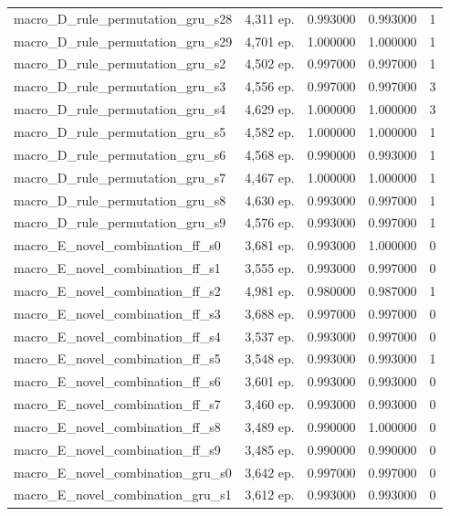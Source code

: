 \begin{tabular}{llrrr}
macro\_D\_rule\_permutation\_gru\_s28 & 4,311 ep. & 0.993000 & 0.993000 & 1 \\
macro\_D\_rule\_permutation\_gru\_s29 & 4,701 ep. & 1.000000 & 1.000000 & 1 \\
macro\_D\_rule\_permutation\_gru\_s2 & 4,502 ep. & 0.997000 & 0.997000 & 1 \\
macro\_D\_rule\_permutation\_gru\_s3 & 4,556 ep. & 0.997000 & 0.997000 & 3 \\
macro\_D\_rule\_permutation\_gru\_s4 & 4,629 ep. & 1.000000 & 1.000000 & 3 \\
macro\_D\_rule\_permutation\_gru\_s5 & 4,582 ep. & 1.000000 & 1.000000 & 1 \\
macro\_D\_rule\_permutation\_gru\_s6 & 4,568 ep. & 0.990000 & 0.993000 & 1 \\
macro\_D\_rule\_permutation\_gru\_s7 & 4,467 ep. & 1.000000 & 1.000000 & 1 \\
macro\_D\_rule\_permutation\_gru\_s8 & 4,630 ep. & 0.993000 & 0.997000 & 1 \\
macro\_D\_rule\_permutation\_gru\_s9 & 4,576 ep. & 0.993000 & 0.997000 & 1 \\
macro\_E\_novel\_combination\_ff\_s0 & 3,681 ep. & 0.993000 & 1.000000 & 0 \\
macro\_E\_novel\_combination\_ff\_s1 & 3,555 ep. & 0.993000 & 0.997000 & 0 \\
macro\_E\_novel\_combination\_ff\_s2 & 4,981 ep. & 0.980000 & 0.987000 & 1 \\
macro\_E\_novel\_combination\_ff\_s3 & 3,688 ep. & 0.997000 & 0.997000 & 0 \\
macro\_E\_novel\_combination\_ff\_s4 & 3,537 ep. & 0.993000 & 0.997000 & 0 \\
macro\_E\_novel\_combination\_ff\_s5 & 3,548 ep. & 0.993000 & 0.993000 & 1 \\
macro\_E\_novel\_combination\_ff\_s6 & 3,601 ep. & 0.993000 & 0.993000 & 0 \\
macro\_E\_novel\_combination\_ff\_s7 & 3,460 ep. & 0.993000 & 0.993000 & 0 \\
macro\_E\_novel\_combination\_ff\_s8 & 3,489 ep. & 0.990000 & 1.000000 & 0 \\
macro\_E\_novel\_combination\_ff\_s9 & 3,485 ep. & 0.990000 & 0.990000 & 0 \\
macro\_E\_novel\_combination\_gru\_s0 & 3,642 ep. & 0.997000 & 0.997000 & 0 \\
macro\_E\_novel\_combination\_gru\_s1 & 3,612 ep. & 0.993000 & 0.993000 & 0 \\

\end{tabular}

